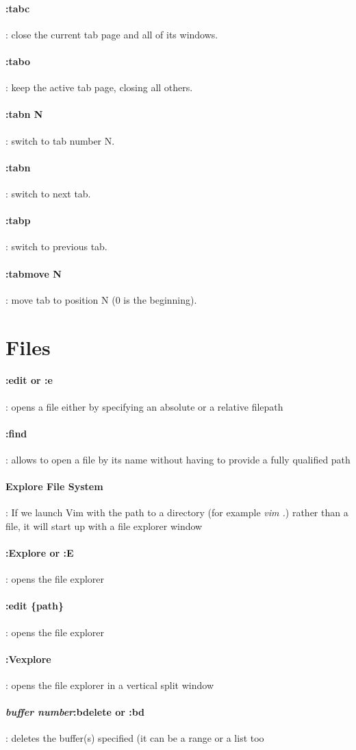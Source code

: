 \documentclass[10pt,letterpaper]{book}
\begin{document}
\paragraph{:tabc}: close the current tab page and all of its windows.
\paragraph{:tabo}: keep the active tab page, closing all others.
\paragraph{:tabn N}: switch to tab number N.
\paragraph{:tabn}: switch to next tab.
\paragraph{:tabp}: switch to previous tab.
\paragraph{:tabmove N}: move tab to position N (0 is the beginning).

\section{Files}
\paragraph{:edit or :e}: opens a file either by specifying
an absolute or a relative filepath
\paragraph{:find}: allows to open a file by its name without having to provide a fully qualified path
\paragraph{Explore File System}: If we launch Vim with the path to a directory (for example \textit{vim .}) rather than a file, it will start up with a file explorer window
\paragraph{:Explore or :E}: opens the file explorer
\paragraph{:edit \{path\}}: opens the file explorer
\paragraph{:Vexplore}: opens the file explorer in a vertical split window
\paragraph{\textit{buffer number}:bdelete or :bd}: deletes the buffer(s) specified (it can be a range or a list too
\end{document}
